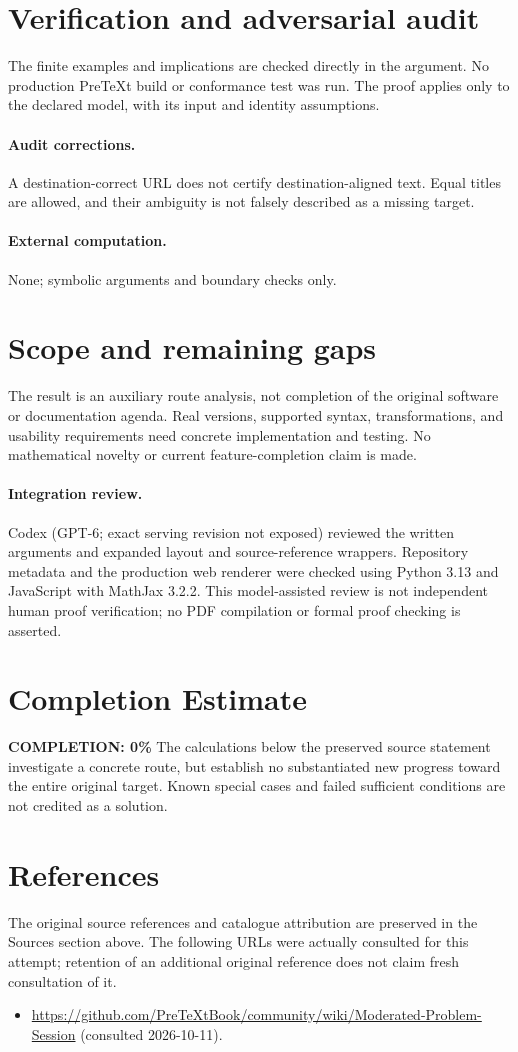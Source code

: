 \documentclass[11pt]{article}
\begin{document}
\section{Verification and adversarial audit}
The finite examples and implications are checked directly in the argument. No production PreTeXt build or conformance test was run. The proof applies only to the declared model, with its input and identity assumptions.
\paragraph{Audit corrections.} A destination-correct URL does not certify destination-aligned text. Equal titles are allowed, and their ambiguity is not falsely described as a missing target.
\paragraph{External computation.} None; symbolic arguments and boundary checks only.
\section{Scope and remaining gaps}
The result is an auxiliary route analysis, not completion of the original software or documentation agenda. Real versions, supported syntax, transformations, and usability requirements need concrete implementation and testing. No mathematical novelty or current feature-completion claim is made.
\paragraph{Integration review.} Codex (GPT-6; exact serving revision not exposed) reviewed the written arguments and expanded layout and source-reference wrappers. Repository metadata and the production web renderer were checked using Python 3.13 and JavaScript with MathJax 3.2.2. This model-assisted review is not independent human proof verification; no PDF compilation or formal proof checking is asserted.

\section{Completion Estimate}
\noindent\textbf{COMPLETION: 0\%}
The calculations below the preserved source statement investigate a concrete route,
but establish no substantiated new progress toward the entire original target.
Known special cases and failed sufficient conditions are not credited as a solution.
\section{References}
The original source references and catalogue attribution are preserved in the
Sources section above. The following URLs were actually consulted for this attempt;
retention of an additional original reference does not claim fresh consultation of it.
\begin{itemize}
\item \url{https://github.com/PreTeXtBook/community/wiki/Moderated-Problem-Session} (consulted 2026-10-11). 
\end{itemize}
\end{document}

